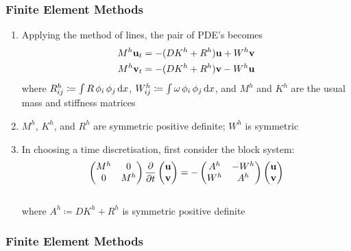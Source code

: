 \begin{frame}
\frametitle{Finite Element Methods}
\begin{enumerate}
    \item Applying the method of lines, the pair of PDE's becomes
    \begin{align*}
        M^h \mathbf{u}_t &= -(D K^h + R^h) \mathbf{u} + W^h \mathbf{v} \\
        M^h \mathbf{v}_t &= -(D K^h + R^h) \mathbf{v} - W^h \mathbf{u}
    \end{align*}
    where $R^h_{ij} \coloneqq \int R \,\phi_i \,\phi_j \operatorname{d}\!{x}$, $W^h_{ij} \coloneqq \int \omega \,\phi_i \,\phi_j \operatorname{d}\!{x}$, and $M^h$ and $K^h$ are the usual mass and stiffness matrices
    \item $M^h$, $K^h$, and $R^h$ are symmetric positive definite; $W^h$ is symmetric
    \item In choosing a time discretisation, first consider the block system:
    \begin{align*}
    \begin{pmatrix}
    M^h & 0 \\ 
    0 & M^h
    \end{pmatrix}
    \frac{\partial }{\partial t}
    \begin{pmatrix} \mathbf{u} \\ \mathbf{v} \end{pmatrix}
    = -
    \begin{pmatrix}
    A^h & -W^h \\ 
    W^h & A^h
    \end{pmatrix}
    \begin{pmatrix} \mathbf{u} \\ \mathbf{v} \end{pmatrix}
    \end{align*}
    \\ where $A^h \coloneqq D K^h + R^h$ is symmetric positive definite
\end{enumerate}
\end{frame}
\frametitle{Finite Element Methods}
